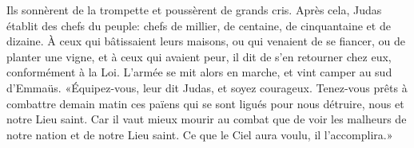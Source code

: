 Ils sonnèrent de la trompette et poussèrent de grands cris.
Après cela, Judas établit des chefs du peuple:
	chefs de millier, de centaine, de cinquantaine et de dizaine.
À ceux qui bâtissaient leurs maisons, ou qui venaient de se fiancer,
		ou de planter une vigne, et à ceux qui avaient peur,
	il dit de s’en retourner chez eux, conformément à la Loi.
L’armée se mit alors en marche, et vint camper au sud d’Emmaüs.
«Équipez-vous, leur dit Judas, et soyez courageux.
	Tenez-vous prêts à combattre demain matin ces païens
	qui se sont ligués pour nous détruire, nous et notre Lieu saint.
Car il vaut mieux mourir au combat
		que de voir les malheurs de notre nation et de notre Lieu saint.
Ce que le Ciel aura voulu, il l’accomplira.»
